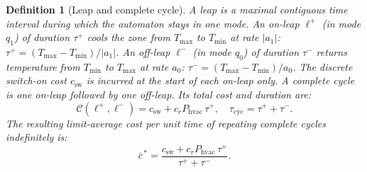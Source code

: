 \documentclass[3p,number]{elsarticle}
\newtheorem{definition}{Definition} \newtheorem{proposition}{Proposition} \newtheorem{remark}{Remark} \newtheorem{observation}{Observation}
\newcommand{\Tmin}{T_{\min}}
\newcommand{\Tmax}{T_{\max}}
\newcommand{\csw}{c_{\mathrm{sw}}}
\newcommand{\Phvac}{P_{\mathrm{hvac}}}
\newcommand{\taup}{\tau^{+}}
\newcommand{\taum}{\tau^{-}}
\begin{document}
\begin{definition}[Leap and complete cycle]
\label{def:leap}
A \emph{leap} is a maximal contiguous time interval during which the
automaton stays in one mode.
An \emph{on-leap} $\ell^+$ (in mode $q_1$) of duration $\taup$ cools
the zone from $\Tmax$ to $\Tmin$ at rate $|a_1|$:
$\taup=({\Tmax-\Tmin})/{|a_1|}$.
An \emph{off-leap} $\ell^-$ (in mode $q_0$) of duration $\taum$ returns
temperature from $\Tmin$ to $\Tmax$ at rate $a_0$:
$\taum=({\Tmax-\Tmin})/{a_0}$.
The discrete switch-on cost $\csw$ is incurred at the start of each
on-leap only.
A \emph{complete cycle} is one on-leap followed by one off-leap.
Its total cost and duration are:
\begin{equation}
  \mathcal{C}(\ell^+,\ell^-)
  = \csw + c_r\Phvac\,\taup,
  \quad
  \tau_{\mathrm{cyc}} = \taup+\taum.
  \label{eq:cycle_cost}
\end{equation}
The resulting \emph{limit-average cost per unit time} of repeating
complete cycles indefinitely is:
\begin{equation}
  \bar{c}^{\,*}
  = \frac{\csw+c_r\Phvac\,\taup}{\,\taup+\taum\,}.
  \label{eq:cstar}
\end{equation}
\end{definition}
 
\end{document}
